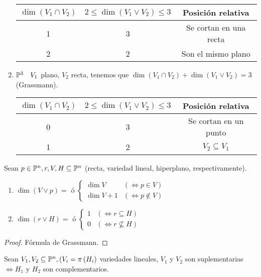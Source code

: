 \begin{example}
\begin{enumerate}
\begin{center}
\begin{tabular}{|c|c|c|}
            \hline $\dim \left( V_1 \cap V_2 \right)$ & $2 \leq \dim \left( V_1 \vee V_2 \right) \leq 3$  & Posición relativa \\
            \hline \hline
            1 & 3 & Se cortan en una recta \\ \hline
            2 & 2 & Son el mismo plano\\ \hline
        \end{tabular} \end{center}
        \item $\mathbb{P}^3 \quad V_1$ plano, $V_2$ recta, tenemos que $\dim \left( V_1 \cap V_2 \right) + \dim \left( V_1 \vee V_2 \right) = 3$ (Grassmann).
        \begin{center} \begin{tabular}{|c|c|c|}
            \hline $\dim \left( V_1 \cap V_2 \right)$ & $2 \leq \dim \left( V_1 \vee V_2 \right) \leq 3$  & Posición relativa \\
            \hline \hline
            0 & 3 & Se cortan en un punto \\ \hline
            1 & 2 & $V_2 \subseteq V_1$ \\ \hline
        \end{tabular} \end{center}
    \end{enumerate}
\end{example}
\begin{prop}
    Sean $p \in \mathbb{P}^n, r, V, H \subseteq \mathbb{P}^n$ (recta, variedad lineal, hiperplano, respectivamente).
    \begin{enumerate}
        \item $\dim \left( V \vee p \right) = \text{ ó } \begin{cases} \dim V & (\iff p \in V) \\ \dim V + 1 & (\iff p \notin V) \end{cases}$
        \item $\dim \left( r \vee H \right) = \text{ ó } \begin{cases} 1 & (\iff r \subseteq H) \\ 0 & (\iff r \nsubseteq H) \end{cases}$
    \end{enumerate}
\end{prop}
\begin{proof}
    Fórmula de Grassmann.
\end{proof}
\begin{defi}
    Sean $V_1, V_2 \subseteq \mathbb{P}^n, (V_i = \pi \left( H_i \right)$ variedades lineales, $V_1$ y $V_2$ son suplementarias $\iff H_1$ y $H_2$
    son complementarios.
\end{defi}
